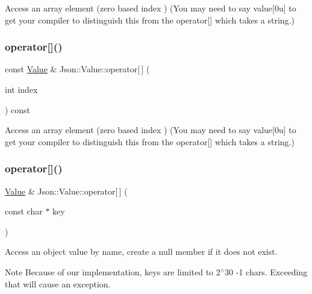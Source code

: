 Access an array element (zero based index ) (You may need to say \textquotesingle{}value\mbox{[}0u\mbox{]}\textquotesingle{} to get your compiler to distinguish this from the operator\mbox{[}\mbox{]} which takes a string.) \mbox{\label{class_json_1_1_value_a0b42557a95621a4676b46a21ffc5e949}} 
\subsubsection{\texorpdfstring{operator[]()}{operator[]()}\hspace{0.1cm}{\footnotesize\ttfamily [4/9]}}
{\footnotesize\ttfamily const \hyperlink{class_json_1_1_value}{Value} \& Json\+::\+Value\+::operator\mbox{[}$\,$\mbox{]} (\begin{DoxyParamCaption}\item[{int}]{index }\end{DoxyParamCaption}) const}

Access an array element (zero based index ) (You may need to say \textquotesingle{}value\mbox{[}0u\mbox{]}\textquotesingle{} to get your compiler to distinguish this from the operator\mbox{[}\mbox{]} which takes a string.) \mbox{\label{class_json_1_1_value_acb912f4ec40a25ea6eb387730885f3d9}} 
\subsubsection{\texorpdfstring{operator[]()}{operator[]()}\hspace{0.1cm}{\footnotesize\ttfamily [5/9]}}
{\footnotesize\ttfamily \hyperlink{class_json_1_1_value}{Value} \& Json\+::\+Value\+::operator\mbox{[}$\,$\mbox{]} (\begin{DoxyParamCaption}\item[{const char $\ast$}]{key }\end{DoxyParamCaption})}

Access an object value by name, create a null member if it does not exist. \begin{DoxyNote}{Note}
Because of our implementation, keys are limited to 2$^\wedge$30 -\/1 chars. Exceeding that will cause an exception. 
\end{DoxyNote}
\mbox{\label{class_json_1_1_value_a1b0498b7b2a520a68137f682d91abdd5}} 

